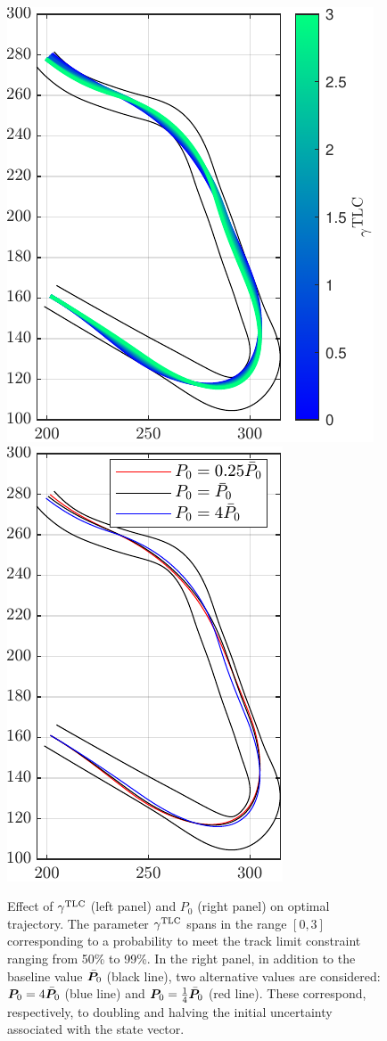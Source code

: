 \begin{figure}
	\centering
	\includegraphics{Fig/gamma_sensitivity.pdf}
	\hfill
	\includegraphics{Fig/Pzero_sensitivity.pdf}
	\caption{Effect of $\gamma^\textrm{TLC}$ (left panel) and $P_0$ (right panel) on optimal trajectory. The parameter $\gamma^\textrm{TLC}$ spans in the range $\left[0,3\right]$ corresponding to a probability to meet the track limit constraint ranging from 50\% to 99\%. In the right panel, in addition to the baseline value $\bar{\boldsymbol{P}}_0$ (black line), two alternative values are considered: $\boldsymbol{P}_0 = 4\bar{\boldsymbol{P}}_0$ (blue line) and $\boldsymbol{P}_0 = \frac{1}{4}\bar{\boldsymbol{P}}_0$ (red line). These correspond, respectively, to doubling and halving the initial uncertainty associated with the state vector.}
	\label{fig:ol_sensitivities}
\end{figure}

